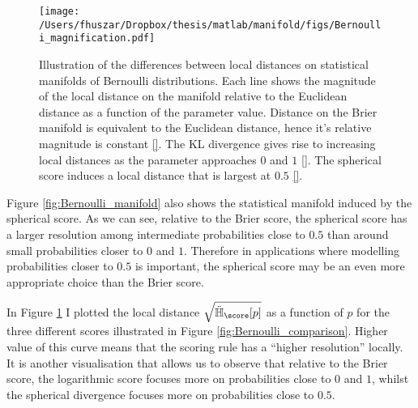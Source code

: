\begin{figure}
	\begin{center}
	 \texttt{[image: /Users/fhuszar/Dropbox/thesis/matlab/manifold/figs/Bernoulli\_magnification.pdf]}
	\end{center}
	\caption[Local distances on the statistical manifold of Bernoulli distributions]{Illustration of the differences between local distances on statistical manifolds of Bernoulli distributions. Each line shows the magnitude of the local distance on the manifold relative to the Euclidean distance as a function of the parameter value. Distance on the Brier manifold is equivalent to the Euclidean distance, hence it's relative magnitude is constant \ref{}. The KL divergence gives rise to increasing local distances as the parameter approaches $0$ and $1$ \ref{}. The spherical score induces a local distance that is largest at $0.5$ \ref{}.}
	\label{fig:Bernoulli_squareddistance}
\end{figure}

Figure \ref{fig:Bernoulli_manifold} also shows the statistical manifold induced by the spherical score. As we can see, relative to the Brier score, the spherical score has a larger resolution among intermediate probabilities close to $0.5$ than around small probabilities closer to $0$ and $1$. Therefore in applications where modelling probabilities closer to $0.5$ is important, the spherical score may be an even more appropriate choice than the Brier score.

In Figure \ref{fig:Bernoulli_squareddistance} I plotted the local distance $\sqrt{\ddot{\mathbb{H}}_{\score}[p]}$ as a function of $p$ for the three different scores illustrated in Figure \ref{fig:Bernoulli_comparison}. Higher value of this curve means that the scoring rule has a ``higher resolution'' locally. It is another visualisation that allows us to observe that relative to the Brier score, the logarithmic score focuses more on probabilities close to $0$ and $1$, whilst the spherical divergence focuses more on probabilities close to $0.5$.


